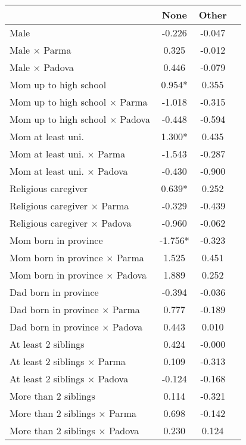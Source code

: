 \begin{tabular}{l c c c}
\toprule
& None & Other \\
\midrule
Male &    -0.226 &    -0.047 \\
Male $\times$ Parma &     0.325 &    -0.012 \\
Male $\times$ Padova &     0.446 &    -0.079 \\
Mom up to high school & 0.954* &     0.355 \\
Mom up to high school $\times$ Parma &    -1.018 &    -0.315 \\
Mom up to high school $\times$ Padova &    -0.448 &    -0.594 \\
Mom at least uni. & 1.300* &     0.435 \\
Mom at least uni. $\times$ Parma &    -1.543 &    -0.287 \\
Mom at least uni. $\times$ Padova &    -0.430 &    -0.900 \\
Religious caregiver & 0.639* &     0.252 \\
Religious caregiver $\times$ Parma &    -0.329 &    -0.439 \\
Religious caregiver $\times$ Padova &    -0.960 &    -0.062 \\
Mom born in province & -1.756* &    -0.323 \\
Mom born in province $\times$ Parma &     1.525 &     0.451 \\
Mom born in province $\times$ Padova &     1.889 &     0.252 \\
Dad born in province &    -0.394 &    -0.036 \\
Dad born in province $\times$ Parma &     0.777 &    -0.189 \\
Dad born in province $\times$ Padova &     0.443 &     0.010 \\
At least 2 siblings &     0.424 &    -0.000 \\
At least 2 siblings $\times$ Parma &     0.109 &    -0.313 \\
At least 2 siblings $\times$ Padova &    -0.124 &    -0.168 \\
More than 2 siblings &     0.114 &    -0.321 \\
More than 2 siblings $\times$ Parma &     0.698 &    -0.142 \\
More than 2 siblings $\times$ Padova &     0.230 &     0.124 \\
\bottomrule
\end{tabular}
